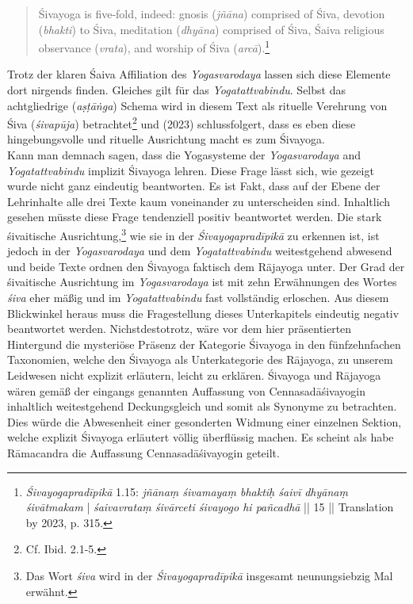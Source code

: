 \begin{quote}
  Śivayoga is five-fold, indeed: gnosis (\textit{jñāna}) comprised of Śiva, devotion (\textit{bhakti}) to Śiva,
meditation (\textit{dhyāna}) comprised of Śiva, Śaiva religious observance (\textit{vrata}), and worship of Śiva
(\textit{arcā}).\footnote{\textit{Śivayogapradīpikā} 1.15: \textit{jñānaṃ śivamayaṃ bhaktiḥ śaivī dhyānaṃ śivātmakam} | \textit{śaivavrataṃ śivārceti śivayogo hi pañcadhā} || 15 || Translation by \citeauthor{powell2023} 2023, p. 315.} 
  \end{quote}
  Trotz der klaren Śaiva Affiliation des \textit{Yogasvarodaya} lassen sich diese Elemente dort nirgends finden. Gleiches gilt für das \textit{Yogatattvabindu}. Selbst das achtgliedrige (\textit{aṣṭāṅga}) Schema wird in diesem Text als rituelle Verehrung von Śiva (\textit{śivapūja}) betrachtet\footnote{Cf. Ibid. 2.1-5.} und \citeauthor{powell2023} (2023) schlussfolgert, dass es eben diese hingebungsvolle und rituelle Ausrichtung macht es zum Śivayoga.\\

  Kann man demnach sagen, dass die Yogasysteme der \textit{Yogasvarodaya} and \textit{Yogatattvabindu} implizit Śivayoga lehren. Diese Frage lässt sich, wie gezeigt wurde nicht ganz eindeutig beantworten. Es ist Fakt, dass auf der Ebene der Lehrinhalte alle drei Texte kaum voneinander zu unterscheiden sind. Inhaltlich gesehen müsste diese Frage tendenziell positiv beantwortet werden. Die stark śivaitische Ausrichtung,\footnote{Das Wort \textit{śiva} wird in der \textit{Śivayogapradīpikā} insgesamt neunungsiebzig Mal erwähnt.} wie sie in der \textit{Śivayogapradīpikā} zu erkennen ist, ist jedoch in der \textit{Yogasvarodaya} und dem \textit{Yogatattvabindu} weitestgehend abwesend und beide Texte ordnen den Śivayoga faktisch dem Rājayoga unter. Der Grad der śivaitische Ausrichtung im \textit{Yogasvarodaya} ist mit zehn Erwähnungen des Wortes \textit{śiva} eher mäßig und im \textit{Yogatattvabindu} fast vollständig erloschen. Aus diesem Blickwinkel heraus muss die Fragestellung dieses Unterkapitels eindeutig negativ beantwortet werden. Nichstdestotrotz, wäre vor dem hier präsentierten Hintergund die mysteriöse Präsenz der Kategorie Śivayoga in den fünfzehnfachen Taxonomien, welche den Śivayoga als Unterkategorie des Rājayoga, zu unserem Leidwesen nicht explizit erläutern, leicht zu erklären. Śivayoga und Rājayoga wären gemäß der eingangs genannten Auffassung von Cennasadāśivayogin inhaltlich weitestgehend Deckungsgleich und somit als Synonyme zu betrachten. Dies würde die Abwesenheit einer gesonderten Widmung einer einzelnen Sektion, welche explizit Śivayoga erläutert völlig überflüssig machen. Es scheint als habe Rāmacandra die Auffassung Cennasadāśivayogin geteilt.        


